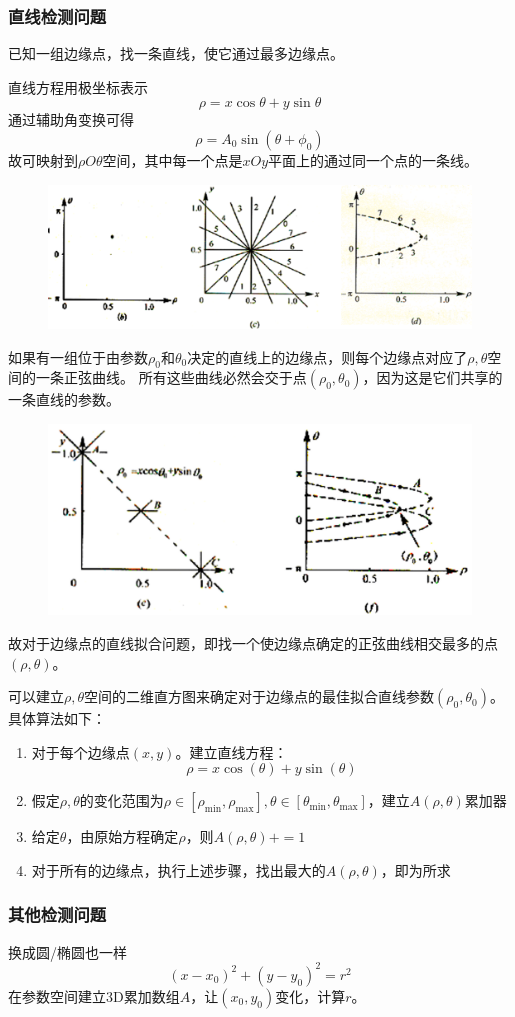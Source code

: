 \subsubsection{直线检测问题}
已知一组边缘点，找一条直线，使它通过最多边缘点。

直线方程用极坐标表示
\[\rho=x\cos\theta+y\sin\theta\]
通过辅助角变换可得
\[\rho=A_0\sin(\theta+\phi_0)\]
故可映射到$\rho O\theta$空间，其中每一个点是$xOy$平面上的通过同一个点的一条线。
\begin{figure}[H]
\centering
\includegraphics[width=0.6\linewidth]{fig/hough.png}
\end{figure}

如果有一组位于由参数$\rho_0$和$\theta_0$决定的直线上的边缘点，则每个边缘点对应了$\rho,\theta$空间的一条正弦曲线。
所有这些曲线必然会交于点$(\rho_0,\theta_0)$，因为这是它们共享的一条直线的参数。
\begin{figure}[H]
\centering
\includegraphics[width=0.6\linewidth]{fig/hough2.png}
\end{figure}

故对于边缘点的直线拟合问题，即找一个使边缘点确定的正弦曲线相交最多的点$(\rho,\theta)$。

可以建立$\rho,\theta$空间的二维直方图来确定对于边缘点的最佳拟合直线参数$(\rho_0,\theta_0)$。
具体算法如下：
\begin{enumerate}
	\item 对于每个边缘点$(x,y)$。建立直线方程：
	\[\rho=x\cos(\theta)+y\sin(\theta)\]
	\item 假定$\rho,\theta$的变化范围为$\rho\in[\rho_{\min},\rho_{\max}],\theta\in[\theta_{\min},\theta_{\max}]$，建立$A(\rho,\theta)$累加器
	\item 给定$\theta$，由原始方程确定$\rho$，则$A(\rho,\theta)+=1$
	\item 对于所有的边缘点，执行上述步骤，找出最大的$A(\rho,\theta)$，即为所求
\end{enumerate}

\subsubsection{其他检测问题}
换成圆/椭圆也一样
\[(x-x_0)^2+(y-y_0)^2=r^2\]
在参数空间建立3D累加数组$A$，让$(x_0,y_0)$变化，计算$r$。